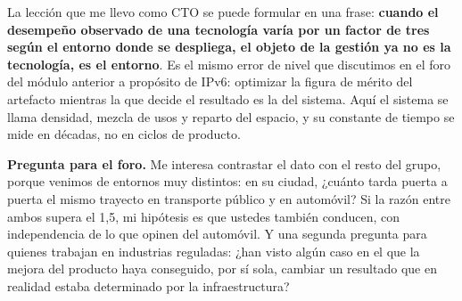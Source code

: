 \documentclass[11pt,letterpaper]{article}
\begin{document}
La lección que me llevo como CTO se puede formular en una frase:
\textbf{cuando el desempeño observado de una tecnología varía por un factor de
tres según el entorno donde se despliega, el objeto de la gestión ya no es la
tecnología, es el entorno}. Es el mismo error de nivel que discutimos en el
foro del módulo anterior a propósito de IPv6: optimizar la figura de mérito del
artefacto mientras la que decide el resultado es la del sistema. Aquí el sistema se llama
densidad, mezcla de usos y reparto del espacio, y su constante de tiempo se
mide en décadas, no en ciclos de producto.

\textbf{Pregunta para el foro.} Me interesa contrastar el dato con el resto del
grupo, porque venimos de entornos muy distintos: en su ciudad, ¿cuánto tarda
puerta a puerta el mismo trayecto en transporte público y en automóvil? Si la
razón entre ambos supera el 1,5, mi hipótesis es que ustedes también conducen,
con independencia de lo que opinen del automóvil. Y una segunda pregunta para
quienes trabajan en industrias reguladas: ¿han visto algún caso en el que la
mejora del producto haya conseguido, por sí sola, cambiar un resultado que en
realidad estaba determinado por la infraestructura?

\printbibliography[title={Referencias bibliográficas}]
\end{document}
